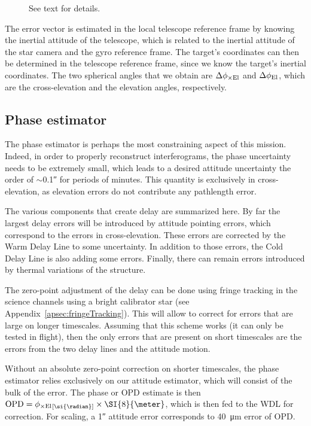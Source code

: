 \begin{figure}[!ht]
	\centering
	
	\caption[The star camera reference frame]{See text for details.}
	\label{fig:starcamRefFrame2}
  \end{figure}

The error vector is estimated in the local telescope reference frame by knowing the inertial attitude of the telescope, which is related to the inertial attitude of the star camera and the gyro reference frame. The target's coordinates can then be determined in the telescope reference frame, since we know the target's inertial coordinates. The two spherical angles that we obtain are $\Delta\phi_{\times\textrm{El}}$ and $\Delta\phi_\textrm{El}$, which are the cross-elevation and the elevation angles, respectively. 


\subsection{Phase estimator}

The phase estimator is perhaps the most constraining aspect of this mission. Indeed, in order to properly reconstruct interferograms, the phase uncertainty needs to be extremely small, which leads to a desired attitude uncertainty the order of $\sim$\ang{;;0.1} for periods of minutes. This quantity is exclusively in cross-elevation, as elevation errors do not contribute any pathlength error. 

The various components that create delay are summarized here. By far the largest delay errors will be introduced by attitude pointing errors, which correspond to the errors in cross-elevation. These errors are corrected by the Warm Delay Line to some uncertainty. In addition to those errors, the Cold Delay Line is also adding some errors. Finally, there can remain errors introduced by thermal variations of the structure.

The zero-point adjustment of the delay can be done using fringe tracking in the science channels using a bright calibrator star (see Appendix~\ref{apsec:fringeTracking}). This will allow to correct for errors that are large on longer timescales. Assuming that this scheme works (it can only be tested in flight), then the only errors that are present on short timescales are the errors from the two delay lines and the attitude motion. 

Without an absolute zero-point correction on shorter timescales, the phase estimator relies exclusively on our attitude estimator, which will consist of the bulk of the error. The phase or OPD estimate is then $\OPD = \crossEl\units{\si{\radian}}\times \SI{8}{\meter} $, which is then fed to the WDL for correction. For scaling, a \ang{;;1} attitude error corresponds to \SI{40}{\um} error of OPD. 

